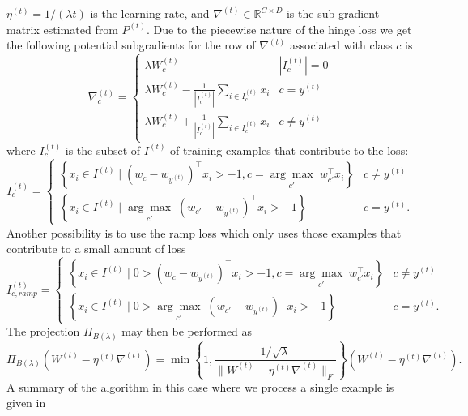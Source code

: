 \documentclass{article}
\begin{document}
$\eta^{(t)}=1/(\lambda t)$ is the learning rate, and $\nabla^{(t)}\in\mathbb{R}^{C\times D}$
is the sub-gradient matrix estimated from $P^{(t)}$. Due to the
piecewise nature of the hinge loss we get the following potential
subgradients for the row of $\nabla^{(t)}$ associated with class
$c$ is
\begin{equation}\label{eq:hinge_subgradient}
\nabla^{(t)}_c = \begin{cases}
\lambda W^{(t)}_c  & |I_c^{(t)}|=0\\
\lambda W^{(t)}_c - \frac{1}{|I_c^{(t)}|}\sum_{i\in I_c^{(t)}} x_i & c =y^{(t)}\\
\lambda W^{(t)}_c + \frac{1}{|I_c^{(t)}|}\sum_{i\in I_c^{(t)}} x_i & c \neq y^{(t)} 
\end{cases}
\end{equation}
where $I_c^{(t)}$ is the subset of $I^{(t)}$ of training examples that contribute to the loss:
\begin{equation}\label{eq:hinge_batch}
I_c^{(t)} = \begin{cases}
\left\{ x_i \in I^{(t)}\mid (w_c - w_{y^{(t)}})^\top x_i > -1,c=\underset{c'}{\arg\max}\; w_{c'}^\top x_i\right\} & c\neq y^{(t)}\\
\left\{ x_i \in I^{(t)}\mid \underset{c'}{\arg\max}\;(w_{c'} - w_{y^{(t)}})^\top x_i > -1\right\} & c = y^{(t)}.
\end{cases}
\end{equation}
Another possibility is to use the ramp loss which only uses those
examples that contribute to a small amount of loss
\begin{equation}\label{eq:ramp_batch}
I_{c,ramp}^{(t)} = \begin{cases}
\left\{ x_i \in I^{(t)}\mid 0 > (w_c - w_{y^{(t)}})^\top x_i > -1,c=\underset{c'}{\arg\max}\; w_{c'}^\top x_i\right\} & c\neq y^{(t)}\\
\left\{ x_i \in I^{(t)}\mid 0 > \underset{c'}{\arg\max}\;(w_{c'} - w_{y^{(t)}})^\top x_i > -1\right\} & c = y^{(t)}.
\end{cases}
\end{equation}
The projection $\Pi_{B(\lambda)}$ may then be performed as
\begin{equation}\label{eq:pegasos-multiclass-projection}
\Pi_{B(\lambda)}(W^{(t)}-\eta^{(t)}\nabla^{(t)}) = \min\left\{ 1,\frac{1/\sqrt{\lambda}}{\|W^{(t)}-\eta^{(t)}\nabla^{(t)}\|_F}\right\} (W^{(t)}-\eta^{(t)}\nabla^{(t)}).
\end{equation}
A summary of the algorithm in this case where we process a single example is given in
\end{document}
